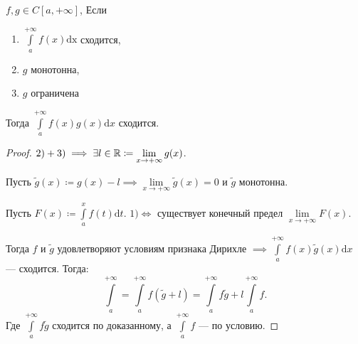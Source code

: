 \begin{theorem}
    $f, g \in C[a, +\infty]$, Если 
     \begin{enumerate}
         \item $\int\limits_a^{+\infty} f(x) \mathrm{dx}$ сходится,
         \item  $g$ монотонна,
         \item  $g$ ограничена
    \end{enumerate}
    Тогда $\int\limits_a^{+\infty} f(x)g(x) \mathrm{d}x$ сходится.
\end{theorem}
\begin{proof}
    $2)+3) \implies \exists l \in \mathbb{R} \coloneqq \lim\limits_{x \to +\infty} g(x)$.

    Пусть $\widetilde{g}(x) \coloneqq g(x) - l \implies \lim\limits_{x \to +\infty}\widetilde{g}(x) = 0$ и  $\widetilde{g}$ монотонна.

    Пусть  $F(x) \coloneqq \int\limits_a^x f(t) \mathrm{d}t$.  $1) \iff$ существует конечный предел  $\lim\limits_{x \to +\infty} F(x)$.

    Тогда  $f$ и  $\widetilde{g}$ удовлетворяют условиям признака Дирихле $\implies \int\limits_a^{+\infty} f(x) \widetilde{g}(x) \mathrm{d}x$ --- сходится. Тогда: \[
    \int\limits_a^{+\infty} = \int\limits_a^{+\infty} f(\widetilde{g}+l) = \int\limits_a^{+\infty} f\widetilde{g} + l \int\limits_a^{+\infty} f
    .\] 
    Где $\int\limits_a^{+\infty} f\widetilde{g}$ сходится по доказанному, а  $\int\limits_a^{+\infty} f$ --- по условию.
\end{proof}
